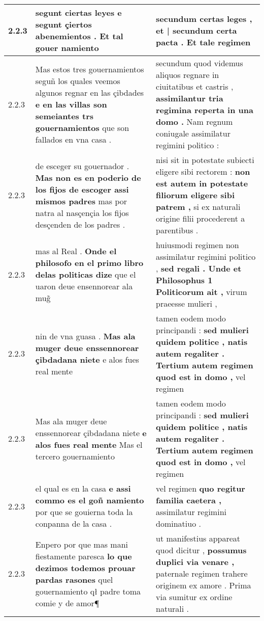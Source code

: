 \begin{tabular}{|p{1cm}|p{6.5cm}|p{6.5cm}|}
2.2.3 & segunt ciertas leyes \textbf{ e segunt çiertos abenemientos . } Et tal gouer namiento & secundum certas leges , \textbf{ et | secundum certa pacta . } Et tale regimen \\\hline
2.2.3 & Mas estos tres gouernamientos seguñ los quales veemos algunos regnar en las çibdades \textbf{ e en las villas son semeiantes trs gouernamientos } que son fallados en vna casa . & secundum quod videmus aliquos regnare in ciuitatibus et castris , \textbf{ assimilantur tria regimina reperta in una domo . } Nam regnum coniugale assimilatur regimini politico : \\\hline
2.2.3 & de esceger su gouernador . \textbf{ Mas non es en poderio de los fijos de escoger assi mismos padres } mas por natra al nasçençia los fijos desçenden de los padres . & nisi sit in potestate subiecti eligere sibi rectorem : \textbf{ non est autem in potestate filiorum eligere sibi patrem , } si ex naturali origine filii procederent a parentibus . \\\hline
2.2.3 & mas al Real . \textbf{ Onde el philosofo en el primo libro delas politicas dize } que el uaron deue ensennorear ala mug̃ & huiusmodi regimen non assimilatur regimini politico , \textbf{ sed regali . Unde et Philosophus 1 Politicorum ait , } virum praeesse mulieri , \\\hline
2.2.3 & nin de vna guasa . \textbf{ Mas ala muger deue enssennorear çibdadana niete } e alos fues real mente & tamen eodem modo principandi : \textbf{ sed mulieri quidem politice , natis autem regaliter . Tertium autem regimen quod est in domo , } vel regimen \\\hline
2.2.3 & Mas ala muger deue enssennorear çibdadana niete \textbf{ e alos fues real mente } Mas el tercero gouernamiento & tamen eodem modo principandi : \textbf{ sed mulieri quidem politice , natis autem regaliter . Tertium autem regimen quod est in domo , } vel regimen \\\hline
2.2.3 & el qual es en la casa \textbf{ e assi commo es el goñ namiento } por que se gouierna toda la conpanna de la casa . & vel regimen \textbf{ quo regitur familia caetera , } assimilatur regimini dominatiuo . \\\hline
2.2.3 & Enpero por que mas mani fiestamente paresca \textbf{ lo que dezimos todemos prouar pardas rasones } quel gouernamiento qł padre toma comie y de amor¶ & ut manifestius appareat quod dicitur , \textbf{ possumus duplici via venare , } paternale regimen trahere originem ex amore . Prima via sumitur ex ordine naturali . \\\hline

\end{tabular}
